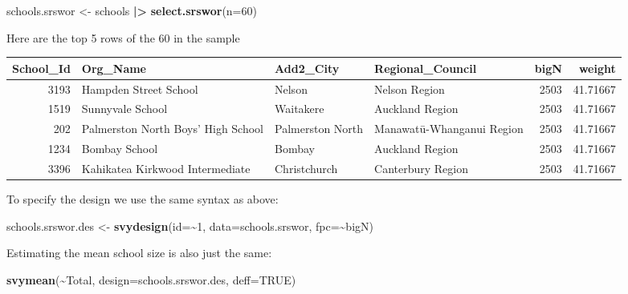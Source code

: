 \documentclass[
]{book}
\newenvironment{Shaded}{\begin{snugshade}}{\end{snugshade}}
\newcommand{\AttributeTok}[1]{\textcolor[rgb]{0.13,0.29,0.53}{#1}}
\newcommand{\ConstantTok}[1]{\textcolor[rgb]{0.56,0.35,0.01}{#1}}
\newcommand{\DecValTok}[1]{\textcolor[rgb]{0.00,0.00,0.81}{#1}}
\newcommand{\FunctionTok}[1]{\textcolor[rgb]{0.13,0.29,0.53}{\textbf{#1}}}
\newcommand{\NormalTok}[1]{#1}
\newcommand{\OtherTok}[1]{\textcolor[rgb]{0.56,0.35,0.01}{#1}}
\newcommand{\SpecialCharTok}[1]{\textcolor[rgb]{0.81,0.36,0.00}{\textbf{#1}}}
\begin{document}
\begin{Shaded}
\begin{Highlighting}[]
\NormalTok{schools.srswor }\OtherTok{\textless{}{-}}\NormalTok{ schools }\SpecialCharTok{|\textgreater{}} \FunctionTok{select.srswor}\NormalTok{(}\AttributeTok{n=}\DecValTok{60}\NormalTok{)}
\end{Highlighting}
\end{Shaded}

Here are the top 5 rows of the 60 in the sample

\begin{table}
\centering
\begin{tabular}[t]{r|l|l|l|r|r}
\hline
School\_Id & Org\_Name & Add2\_City & Regional\_Council & bigN & weight\\
\hline
3193 & Hampden Street School & Nelson & Nelson Region & 2503 & 41.71667\\
\hline
1519 & Sunnyvale School & Waitakere & Auckland Region & 2503 & 41.71667\\
\hline
202 & Palmerston North Boys' High School & Palmerston North & Manawatū-Whanganui Region & 2503 & 41.71667\\
\hline
1234 & Bombay School & Bombay & Auckland Region & 2503 & 41.71667\\
\hline
3396 & Kahikatea Kirkwood Intermediate & Christchurch & Canterbury Region & 2503 & 41.71667\\
\hline
\end{tabular}
\end{table}

To specify the design we use the same syntax as above:

\begin{Shaded}
\begin{Highlighting}[]
\NormalTok{schools.srswor.des }\OtherTok{\textless{}{-}} \FunctionTok{svydesign}\NormalTok{(}\AttributeTok{id=}\SpecialCharTok{\textasciitilde{}}\DecValTok{1}\NormalTok{, }\AttributeTok{data=}\NormalTok{schools.srswor, }\AttributeTok{fpc=}\SpecialCharTok{\textasciitilde{}}\NormalTok{bigN)}
\end{Highlighting}
\end{Shaded}

Estimating the mean school size is also just the same:

\begin{Shaded}
\begin{Highlighting}[]
\FunctionTok{svymean}\NormalTok{(}\SpecialCharTok{\textasciitilde{}}\NormalTok{Total, }\AttributeTok{design=}\NormalTok{schools.srswor.des, }\AttributeTok{deff=}\ConstantTok{TRUE}\NormalTok{)}
\end{Highlighting}
\end{Shaded}
\end{document}
